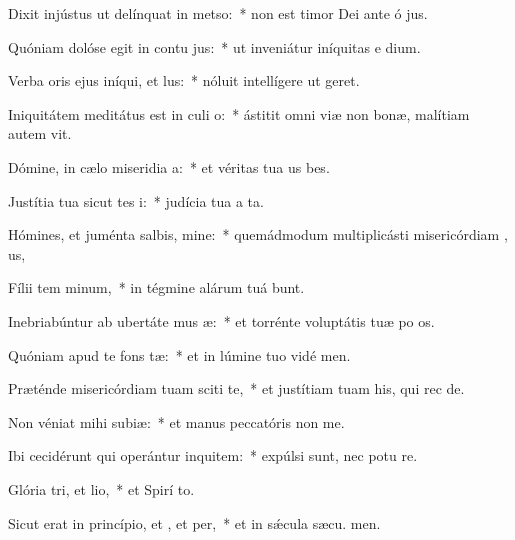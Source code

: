 \item Dixit injústus ut delínquat in metso:~* non est timor Dei ante ó jus.
\item Quóniam dolóse egit in contu jus:~* ut inveniátur iníquitas e  dium.
\item Verba oris ejus iníqui, et lus:~* nóluit intellígere ut  geret.
\item Iniquitátem meditátus est in culi o:~* ástitit omni viæ non bonæ, malítiam autem  vit.
\item Dómine, in cælo miseridia a:~* et véritas tua us  bes.
\item Justítia tua sicut tes i:~* judícia tua a ta.
\item Hómines, et juménta salbis, mine:~* quemádmodum multiplicásti misericórdiam , us,
\item Fílii tem minum,~* in tégmine alárum tuá bunt.
\item Inebriabúntur ab ubertáte mus æ:~* et torrénte voluptátis tuæ po os.
\item Quóniam apud te  fons tæ:~* et in lúmine tuo vidé men.
\item Præténde misericórdiam tuam sciti te,~* et justítiam tuam his, qui rec  de.
\item Non véniat mihi  subiæ:~* et manus peccatóris non  me.
\item Ibi cecidérunt qui operántur inquitem:~* expúlsi sunt, nec potu re.
\item Glória tri, et lio,~* et Spirí to.
\item Sicut erat in princípio, et , et per,~* et in sǽcula sæcu. men.
